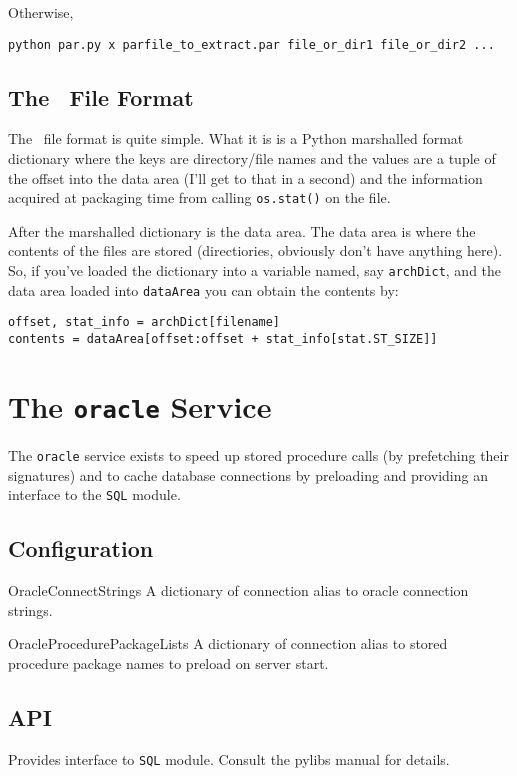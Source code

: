 \documentclass{manual}
\begin{document}
Otherwise,
\begin{verbatim}
python par.py x parfile_to_extract.par file_or_dir1 file_or_dir2 ...
\end{verbatim}


\section{The \PAR\ File Format}
The \PAR\ file format is quite simple.  What it is is a Python
marshalled format dictionary where the keys are directory/file names
and the values are a tuple of the offset into the data area (I'll get
to that in a second) and the information acquired at packaging time
from calling \texttt{os.stat()} on the file.

After the marshalled dictionary is the data area.  The data area is
where the contents of the files are stored (directiories, obviously
don't have anything here).  So, if you've loaded the dictionary into a
variable named, say \texttt{archDict}, and the data area loaded into
\texttt{dataArea} you can obtain the contents by:
\begin{verbatim}
offset, stat_info = archDict[filename]
contents = dataArea[offset:offset + stat_info[stat.ST_SIZE]]
\end{verbatim}


\chapter{The \texttt{oracle} Service}
The \texttt{oracle} service exists to 
speed up stored procedure calls (by prefetching their signatures) and
to cache database connections by preloading and providing an interface
to the \texttt{SQL} module.

\section{Configuration}

\begin{datadesc}{OracleConnectStrings} A dictionary of connection
alias to oracle connection strings. \nolocation
\end{datadesc}
\begin{datadesc}{OracleProcedurePackageLists} A dictionary of connection alias to
stored procedure package names to preload on server start. \nolocation
\end{datadesc}


\section{API}
Provides interface to \texttt{SQL} module.  Consult
the pylibs manual for details.
\end{document}

